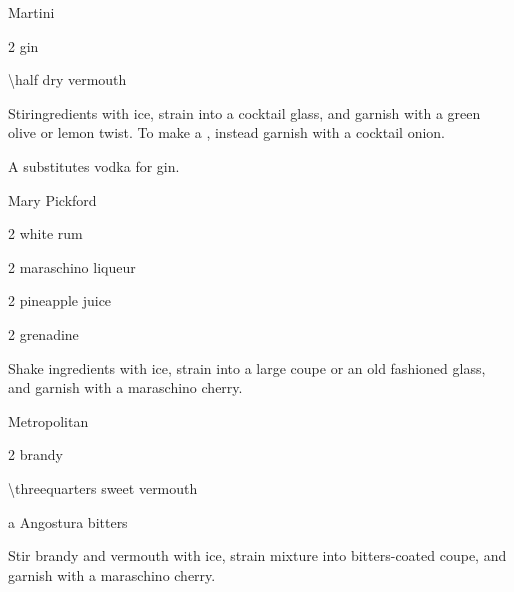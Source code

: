 \begin{Cocktail}{Martini}
  \begin{Ingredients}
  \item \SI{2}{\oz} gin
  \item \SI{\half}{\oz} dry vermouth
  \end{Ingredients}
  
  \begin{Instructions}
	Stir\footnotemark[1] ingredients with ice, strain into a cocktail glass, and garnish with a green olive or lemon twist.  To make a , instead garnish with a cocktail onion.
	
	A  substitutes vodka for gin.
  \end{Instructions}
\end{Cocktail}

\begin{Cocktail}{Mary Pickford}
  \begin{Ingredients}
  \item \SI{2}{\oz} white rum
  \item \SI{2}{\tsp} maraschino liqueur
  \item \SI{2}{\oz} pineapple juice
  \item \SI{2}{\tsp} grenadine
  \end{Ingredients}
  
  \begin{Instructions}
	Shake ingredients with ice, strain into a large coupe or an old fashioned glass, and garnish with a maraschino cherry.
  \end{Instructions}
\end{Cocktail}

\begin{Cocktail}{Metropolitan}
  \begin{Ingredients}
  \item \SI{2}{\oz} brandy
  \item \SI{\threequarters}{\oz} sweet vermouth
  \item a \si{\dash} Angostura bitters
  \end{Ingredients}
  
  \begin{Instructions}
	Stir brandy and vermouth with ice, strain mixture into bitters-coated coupe, and garnish with a maraschino cherry.
  \end{Instructions}
\end{Cocktail}

